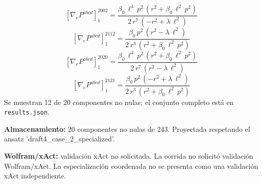 \documentclass[11pt]{article}
\begin{document}
\begin{dmath*}[breakdepth={5}]
\left[\nabla_e P^{abcd}\right]_{1}^{2002} = \frac{\beta_{0}\,{\ell}^{4}\,{p}^{2}\,\left({r}^{2} + \beta_{0}\,{\ell}^{2}\,{p}^{2}\right)}{2\,{r}^{7}\,\left(-{r}^{2} + \lambda\,{\ell}^{2}\right)}
\end{dmath*}
\begin{dmath*}[breakdepth={5}]
\left[\nabla_e P^{abcd}\right]_{1}^{2112} = \frac{\beta_{0}\,{p}^{2}\,\left({r}^{2} - \lambda\,{\ell}^{2}\right)}{2\,{r}^{3}\,\left({r}^{2} + \beta_{0}\,{\ell}^{2}\,{p}^{2}\right)}
\end{dmath*}
\begin{dmath*}[breakdepth={5}]
\left[\nabla_e P^{abcd}\right]_{1}^{2020} = \frac{\beta_{0}\,{\ell}^{4}\,{p}^{2}\,\left({r}^{2} + \beta_{0}\,{\ell}^{2}\,{p}^{2}\right)}{2\,{r}^{7}\,\left({r}^{2} - \lambda\,{\ell}^{2}\right)}
\end{dmath*}
\begin{dmath*}[breakdepth={5}]
\left[\nabla_e P^{abcd}\right]_{1}^{2121} = \frac{\beta_{0}\,{p}^{2}\,\left(-{r}^{2} + \lambda\,{\ell}^{2}\right)}{2\,{r}^{3}\,\left({r}^{2} + \beta_{0}\,{\ell}^{2}\,{p}^{2}\right)}
\end{dmath*}
Se muestran 12 de 20 componentes no nulas; el conjunto completo está en \texttt{results.json}.\par
\textbf{Almacenamiento:} 20 componentes no nulas de 243. Proyectada respetando el ansatz 'draft4\_case\_2\_specialized'.\par
\textbf{Wolfram/xAct:} validación xAct no solicitada. La corrida no solicitó validación Wolfram/xAct. La especialización coordenada no se presenta como una validación xAct independiente.\par\medskip
{}
\end{document}
